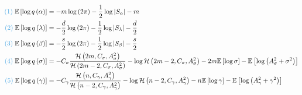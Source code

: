 \documentclass[11pt]{article}
\begin{document}
\begin{align*}
  \textcolor{myblue}{(1)}\;\mathbb{E}\left[\log q\left(\alpha\right)\right] &= -m\log \left(2\pi \right) -\frac{1}{2}\log \left|S_{\alpha}\right| -m\\
  \textcolor{myblue}{(2)}\;\mathbb{E}\left[\log q\left(\lambda\right)\right] &= -\frac{d}{2}\log \left(2\pi \right) -\frac{1}{2}\log \left|S_{\lambda}\right| -\frac{d}{2}\\
  \textcolor{myblue}{(3)}\;\mathbb{E}\left[\log q\left(\beta\right)\right] &= -\frac{s}{2}\log \left(2\pi \right) -\frac{1}{2}\log \left|S_{\beta}\right| -\frac{s}{2}\\
  \textcolor{myblue}{(4)}\;\mathbb{E}\left[\log q\left(\sigma\right)\right] &= -C_{\sigma}\frac{\mathcal{H}\left(2m, C_{\sigma}, A_{\sigma}^{2}\right)}{\mathcal{H}\left(2m-2, C_{\sigma}, A_{\sigma}^{2}\right)} -\log \mathcal{H}\left(2m-2, C_{\sigma}, A_{\sigma}^{2}\right) -2m \mathbb{E}\left[\log \sigma\right] -\mathbb{E}\left[\log \left(A_{\sigma}^{2}+\sigma^{2}\right)\right]\\
  \textcolor{myblue}{(5)}\;\mathbb{E}\left[\log q\left(\gamma\right)\right] &= -C_{\gamma}\frac{\mathcal{H}\left(n, C_{\gamma}, A_{\gamma}^{2}\right)}{\mathcal{H}\left(n-2, C_{\gamma}, A_{\gamma}^{2}\right)} -\log \mathcal{H}\left(n-2, C_{\gamma}, A_{\gamma}^{2}\right) -n \mathbb{E}\left[\log \gamma\right] -\mathbb{E}\left[\log \left(A_{\gamma}^{2}+\gamma^{2}\right)\right]
\end{align*}
\end{document}
